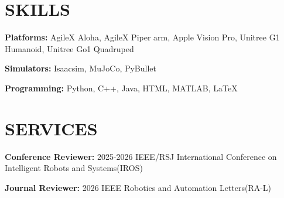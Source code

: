 \documentclass[a4paper,9pt]{extarticle}
\begin{document}
\section*{{\textbf{\fontsize{14pt}{8pt}\selectfont S}\textbf{\scshape KILLS}}}
\textbf{Platforms:}{ AgileX Aloha, AgileX Piper arm, Apple Vision Pro, Unitree
G1 Humanoid, Unitree Go1 Quadruped}
\par\vspace{4pt}\noindent
\textbf{Simulators:}{ Isaacsim, MuJoCo, PyBullet}
\par\vspace{4pt}\noindent
\textbf{Programming:}{ Python, C++, Java, HTML, MATLAB, \LaTeX}

\section*{{\textbf{\fontsize{14pt}{8pt}\selectfont S}\textbf{\scshape ERVICES}}}
\textbf{Conference Reviewer:} 2025-2026 IEEE/RSJ International Conference on Intelligent Robots and Systems(IROS) 
\par\vspace{4pt}\noindent
\textbf{Journal Reviewer:}{ 2026 IEEE Robotics and Automation Letters(RA-L)}
\end{document}
